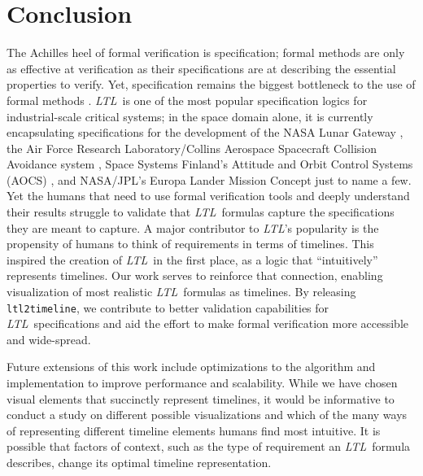 \documentclass[preprint,12pt]{elsarticle}
\theoremstyle{definition}
\theoremstyle{remark}
\newcommand{\ltl}{\textit{LTL}}
\newcommand{\tool}{\hspace{0.1cm}\texttt{ltl2timeline}\hspace{0.1cm}}
\begin{document}
\section{Conclusion}
The Achilles heel of formal verification is specification; formal methods are only as effective at verification as their specifications are at describing the essential properties to verify. Yet, specification remains the biggest bottleneck to the use of formal methods \cite{Roz16}. \ltl\ is one of the most popular specification logics for industrial-scale critical systems; in the space domain alone, it is currently encapsulating specifications for the development of the NASA Lunar Gateway \cite{DBR21}, the Air Force Research Laboratory/Collins Aerospace Spacecraft Collision Avoidance system \cite{HDWF21}, Space Systems Finland's Attitude and Orbit Control Systems (AOCS) \cite{ILLTV13}, and NASA/JPL's Europa Lander Mission Concept \cite{CDRWRWL22} just to name a few.
Yet the humans that need to use formal verification tools and deeply understand their results struggle to validate that \ltl\ formulas capture the specifications they are meant to capture. A major contributor to \ltl's popularity is the propensity of humans to think of requirements in terms of timelines. This inspired the creation of \ltl\ in the first place, as a logic that ``intuitively'' represents timelines. Our work serves to reinforce that connection, enabling visualization of most realistic \ltl\ formulas as timelines. By releasing \tool, we contribute to better validation capabilities for \ltl\ specifications and aid the effort to make formal verification more accessible and wide-spread.

Future extensions of this work include optimizations to the algorithm and implementation to improve performance and scalability. While we have chosen visual elements that succinctly represent timelines, it would be informative to conduct a study on different possible visualizations and which of the many ways of representing different timeline elements humans find most intuitive. It is possible that factors of context, such as the type of requirement an \ltl\ formula describes, change its optimal timeline representation.

\appendix
\end{document}
